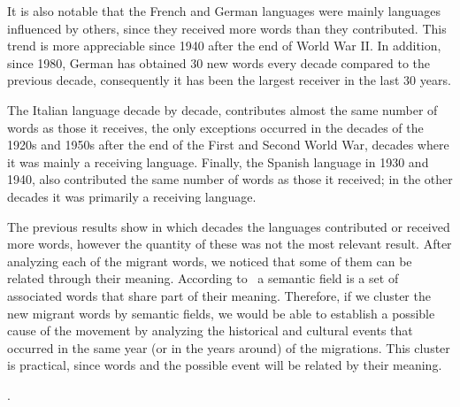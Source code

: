 \documentclass[10pt,letterpaper]{article} %
\begin{document}
It is also notable that the French and German languages were mainly languages influenced by others, since they received more words than they contributed. This trend is more appreciable since 1940 after the end of World War II. In addition, since 1980, German has obtained 30 new words every decade compared to the previous decade, consequently it has been the largest receiver in the last 30 years.

The Italian language decade by decade, contributes almost the same number of words as those it receives, the only exceptions occurred in the decades of the 1920s and 1950s after the end of the First and Second World War, decades where it was mainly a receiving language. Finally, the Spanish language in 1930 and 1940, also contributed the same number of words as those it received; in the other decades it was primarily a receiving language.


The previous results show in which decades the languages ​​contributed or received more words, however the quantity of these was not the most relevant result. After analyzing each of the migrant words, we noticed that some of them can be related through their meaning. According to~\cite{semantic_oxford} a semantic field is a set of
associated words that share part of their meaning. Therefore, if we cluster the new migrant words  by semantic fields, we would be able to establish a possible cause of the movement by analyzing the historical and cultural events that occurred  in the same year (or in the years around) of the migrations. This cluster is practical, since words and the possible event will be related by their meaning. 


. 
\end{document}
